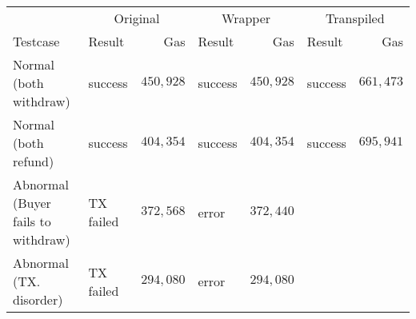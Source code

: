 \documentclass[8pt, english]{jsarticle}
\begin{document}
\begin{tabular}{llrlrlr}\toprule
& \multicolumn{2}{c}{Original}
& \multicolumn{2}{c}{Wrapper}
& \multicolumn{2}{c}{Transpiled} \\
\cmidrule(lr){2-3} \cmidrule(lr){4-5} \cmidrule(lr){6-7}
Testcase & Result & Gas & Result & Gas & Result & Gas \\
\midrule
Normal (both withdraw) & success & $450,928$ & success & $450,928$ & success & $661,473$ \\
Normal (both refund) & success & $404,354$ & success & $404,354$ & success & $695,941$ \\
Abnormal (Buyer fails to withdraw) & TX failed & $372,568$ & error & $372,440$ \\
Abnormal (TX. disorder) & TX failed & $294,080$ & error & $294,080$ \\
\bottomrule
\end{tabular}
\end{document}
